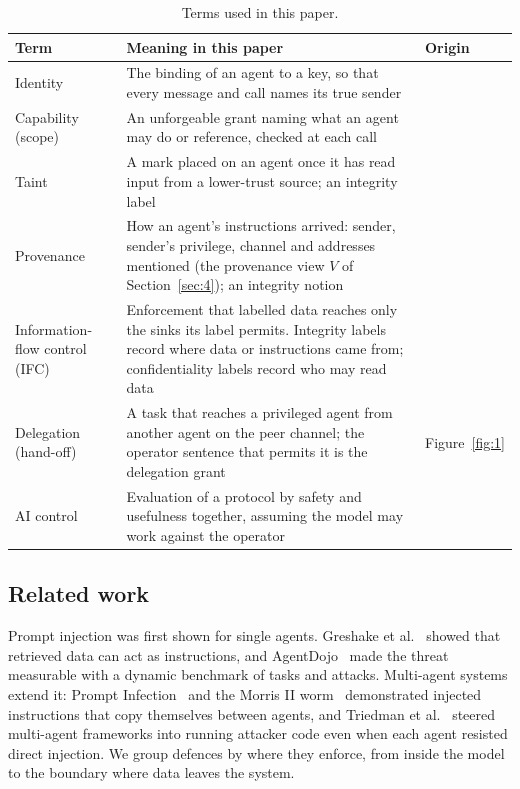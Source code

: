 \documentclass[conference,compsoc]{IEEEtran}
\begin{document}
\begin{table}[!t]
\centering
\caption{Terms used in this paper.}
\label{tab:1}
\footnotesize
\begin{tabularx}{\columnwidth}{@{}>{\raggedright\arraybackslash}p{}>{\raggedright\arraybackslash}X>{\raggedright\arraybackslash}p{}@{}}
\toprule
\textbf{Term} & \textbf{Meaning in this paper} & \textbf{Origin} \\
\midrule
Identity & The binding of an agent to a key, so that every message and call names its true sender & \cite{anderson1972} \\
Capability (scope) & An unforgeable grant naming what an agent may do or reference, checked at each call & \cite{hardy1988,saltzer1975,debenedetti2025camel} \\
Taint & A mark placed on an agent once it has read input from a lower-trust source; an integrity label & \cite{denning1976,costa2025} \\
Provenance & How an agent's instructions arrived: sender, sender's privilege, channel and addresses mentioned (the provenance view $V$ of Section~\ref{sec:4}); an integrity notion & \cite{petersgill2026,debenedetti2025camel} \\
Information-flow control (IFC) & Enforcement that labelled data reaches only the sinks its label permits. Integrity labels record where data or instructions came from; confidentiality labels record who may read data & \cite{denning1976,goguen1982,myers1997,sabelfeld2003} \\
Delegation (hand-off) & A task that reaches a privileged agent from another agent on the peer channel; the operator sentence that permits it is the delegation grant & Figure~\ref{fig:1} \\
AI control & Evaluation of a protocol by safety and usefulness together, assuming the model may work against the operator & \cite{greenblatt2024} \\
\bottomrule
\end{tabularx}
\end{table}

\subsection{Related work}\label{sec:2.2}

Prompt injection was first shown for single agents. Greshake et al.~\cite{greshake2023} showed that retrieved data can act as instructions, and AgentDojo~\cite{debenedetti2024agentdojo} made the threat measurable with a dynamic benchmark of tasks and attacks. Multi-agent systems extend it: Prompt Infection~\cite{lee2024promptinfection} and the Morris II worm~\cite{cohen2024aiworm} demonstrated injected instructions that copy themselves between agents, and Triedman et al.~\cite{triedman2025} steered multi-agent frameworks into running attacker code even when each agent resisted direct injection. We group defences by where they enforce, from inside the model to the boundary where data leaves the system.
\end{document}
